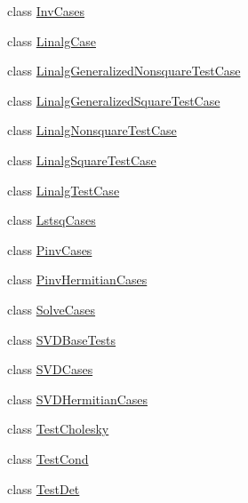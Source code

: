 \begin{DoxyCompactItemize}
\item 
class \hyperlink{classnumpy_1_1linalg_1_1tests_1_1test__linalg_1_1InvCases}{Inv\+Cases}
\item 
class \hyperlink{classnumpy_1_1linalg_1_1tests_1_1test__linalg_1_1LinalgCase}{Linalg\+Case}
\item 
class \hyperlink{classnumpy_1_1linalg_1_1tests_1_1test__linalg_1_1LinalgGeneralizedNonsquareTestCase}{Linalg\+Generalized\+Nonsquare\+Test\+Case}
\item 
class \hyperlink{classnumpy_1_1linalg_1_1tests_1_1test__linalg_1_1LinalgGeneralizedSquareTestCase}{Linalg\+Generalized\+Square\+Test\+Case}
\item 
class \hyperlink{classnumpy_1_1linalg_1_1tests_1_1test__linalg_1_1LinalgNonsquareTestCase}{Linalg\+Nonsquare\+Test\+Case}
\item 
class \hyperlink{classnumpy_1_1linalg_1_1tests_1_1test__linalg_1_1LinalgSquareTestCase}{Linalg\+Square\+Test\+Case}
\item 
class \hyperlink{classnumpy_1_1linalg_1_1tests_1_1test__linalg_1_1LinalgTestCase}{Linalg\+Test\+Case}
\item 
class \hyperlink{classnumpy_1_1linalg_1_1tests_1_1test__linalg_1_1LstsqCases}{Lstsq\+Cases}
\item 
class \hyperlink{classnumpy_1_1linalg_1_1tests_1_1test__linalg_1_1PinvCases}{Pinv\+Cases}
\item 
class \hyperlink{classnumpy_1_1linalg_1_1tests_1_1test__linalg_1_1PinvHermitianCases}{Pinv\+Hermitian\+Cases}
\item 
class \hyperlink{classnumpy_1_1linalg_1_1tests_1_1test__linalg_1_1SolveCases}{Solve\+Cases}
\item 
class \hyperlink{classnumpy_1_1linalg_1_1tests_1_1test__linalg_1_1SVDBaseTests}{S\+V\+D\+Base\+Tests}
\item 
class \hyperlink{classnumpy_1_1linalg_1_1tests_1_1test__linalg_1_1SVDCases}{S\+V\+D\+Cases}
\item 
class \hyperlink{classnumpy_1_1linalg_1_1tests_1_1test__linalg_1_1SVDHermitianCases}{S\+V\+D\+Hermitian\+Cases}
\item 
class \hyperlink{classnumpy_1_1linalg_1_1tests_1_1test__linalg_1_1TestCholesky}{Test\+Cholesky}
\item 
class \hyperlink{classnumpy_1_1linalg_1_1tests_1_1test__linalg_1_1TestCond}{Test\+Cond}
\item 
class \hyperlink{classnumpy_1_1linalg_1_1tests_1_1test__linalg_1_1TestDet}{Test\+Det}
\item 

\end{DoxyCompactItemize}
